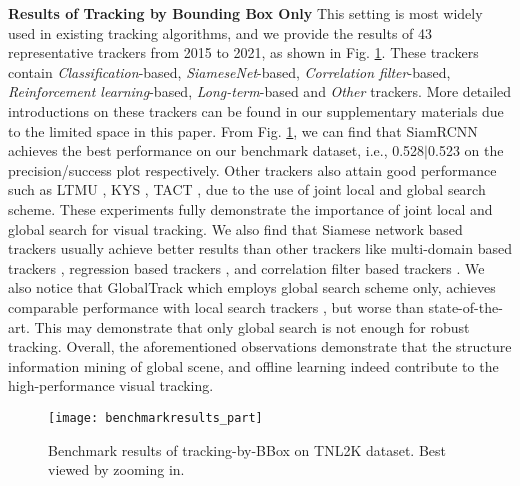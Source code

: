 \documentclass[final]{cvpr}
\begin{document}
\textbf{Results of Tracking by Bounding Box Only}
This setting is most widely used in existing tracking algorithms, and we provide the results of 43 representative trackers from 2015 to 2021, as shown in Fig. \ref{benchmarkresultsBBox}. These trackers contain \emph{Classification}-based, \emph{SiameseNet}-based, \emph{Correlation filter}-based, \emph{Reinforcement learning}-based, \emph{Long-term}-based and \emph{Other} trackers. More detailed introductions on these trackers can be found in our supplementary materials due to the limited space in this paper. From Fig. \ref{benchmarkresultsBBox}, we can find that SiamRCNN \cite{voigtlaender2020siamRCNN} achieves the best performance on our benchmark dataset, i.e., 0.528$|$0.523 on the precision/success plot respectively. Other trackers also attain good performance such as LTMU \cite{dai2020ltmu}, KYS \cite{Goutam2020KYS}, TACT \cite{choi2020TACT}, due to the use of joint local and global search scheme. These experiments fully demonstrate the importance of joint local and global search for visual tracking. We also find that Siamese network based trackers usually achieve better results than other trackers like multi-domain based trackers \cite{Jung_2018_ECCV, Park_2018_ECCV, Nam2015Learning}, regression based trackers \cite{held2016GOTURN}, and correlation filter based trackers \cite{Henriques2015High, bertinetto2016staple, Danelljan2016ECO}. We also notice that GlobalTrack \cite{huang2019globaltrack} which employs global search scheme only, achieves comparable performance with local search trackers \cite{zhang2020ocean, Nam2015Learning}, but worse than state-of-the-art. This may demonstrate that only global search is not enough for robust tracking. Overall, the aforementioned observations demonstrate that the structure information mining of global scene, and offline learning indeed contribute to the high-performance visual tracking. 



\begin{figure} 
\center
\texttt{[image: benchmarkresults\_part]}
\caption{Benchmark results of tracking-by-BBox on TNL2K dataset. Best viewed by zooming in. }
\label{benchmarkresultsBBox}
\end{figure} 	
\end{document}
